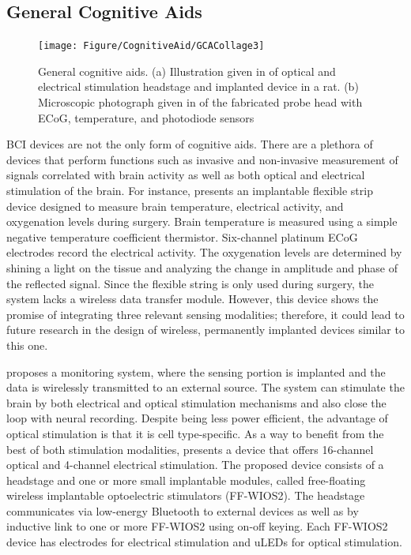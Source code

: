 \subsection{General Cognitive Aids}
\begin{figure}[t]
    \centering
    \texttt{[image: Figure/CognitiveAid/GCACollage3]}
    \caption{General cognitive aids. (a) Illustration given in \textcite{jia_mm-sized_2020} of optical and electrical stimulation headstage and implanted device in a rat. (b) Microscopic photograph given in \textcite{yamakawa_implantable_2019} of the fabricated probe head with ECoG, temperature, and photodiode sensors}
    \label{fig:GCACollage}
\end{figure}
BCI devices are not the only form of cognitive aids. There are a plethora of devices that perform functions such as invasive and non-invasive measurement of signals correlated with brain activity as well as both optical and electrical stimulation of the brain. 
For instance, \textcite{yamakawa_implantable_2019} presents an implantable flexible strip device designed to measure brain temperature, electrical activity, and oxygenation levels during surgery. Brain temperature is measured using a simple negative temperature coefficient thermistor. Six-channel platinum ECoG electrodes record the electrical activity. The oxygenation levels are determined by shining a light on the tissue and analyzing the change in amplitude and phase of the reflected signal. Since the flexible string is only used during surgery, the system lacks a wireless data transfer module. However, this device shows the promise of integrating three relevant sensing modalities; therefore, it could lead to future research in the design of wireless, permanently implanted devices similar to this one. 

\textcite{jia_mm-sized_2020} proposes a monitoring system, where the sensing portion is implanted and the data is wirelessly transmitted to an external source. The system can stimulate the brain by both electrical and optical stimulation mechanisms and also close the loop with neural recording. Despite being less power efficient, the advantage of optical stimulation is that it is cell type-specific. As a way to benefit from the best of both stimulation modalities, \textcite{jia_mm-sized_2020} presents a device that offers 16-channel optical and 4-channel electrical stimulation. The proposed device consists of a headstage and one or more small implantable modules, called free-floating wireless implantable optoelectric stimulators (FF-WIOS2). The headstage communicates via low-energy Bluetooth to external devices as well as by inductive link to one or more FF-WIOS2 using on-off keying. Each FF-WIOS2 device has electrodes for electrical stimulation and uLEDs for optical stimulation. 

